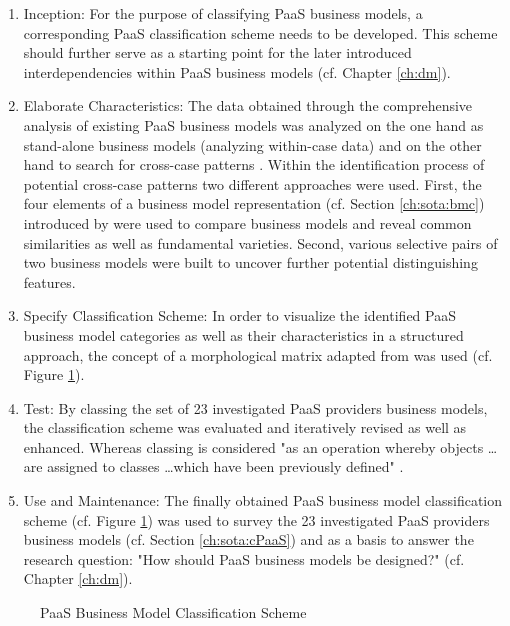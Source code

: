 \begin{enumerate}
	\item Inception: For the purpose of classifying \ac{PaaS} business models, a corresponding \ac{PaaS} classification scheme needs to be developed. This scheme should further serve as a starting point for the later introduced interdependencies within \ac{PaaS} business models (cf. Chapter \ref{ch:dm}).

	\item Elaborate Characteristics: The data obtained through the comprehensive analysis of existing \ac{PaaS} business models was analyzed on the one hand as stand-alone business models (analyzing within-case data) and on the other hand to search for cross-case patterns \citep[pp. 539-540]{Eisenhardt1989}. Within the identification process of potential cross-case patterns two different approaches were used. First, the four elements of a business model representation (cf. Section \ref{ch:sota:bmc}) introduced by \citet{Johnson2008} were used to compare business models and reveal common similarities as well as fundamental varieties. Second, various selective pairs of two business models were built to uncover further potential distinguishing features. 

	\item Specify Classification Scheme: In order to visualize the identified \ac{PaaS} business model categories as well as their characteristics in a structured approach, the concept of a morphological matrix adapted from \citet{ Zwicky1969} was used (cf. Figure \ref{fig:cs}).

	\item Test: By classing the set of 23 investigated \ac{PaaS} providers business models, the classification scheme was evaluated and iteratively revised as well as enhanced. Whereas classing is considered "as an operation whereby objects \ldots are assigned to classes \ldots which have been previously defined" \citep[p. 130]{Marradi1990}.

	\item Use and Maintenance: The finally obtained \ac{PaaS} business model classification scheme (cf. Figure \ref{fig:cs}) was used to survey the 23 investigated \ac{PaaS} providers business models (cf. Section \ref{ch:sota:cPaaS}) and as a basis to answer the research question: "How should \ac{PaaS} business models be designed?" (cf. Chapter \ref{ch:dm}).

\end{enumerate}

\begin{figure}[htb]
	\centering
	
	\caption{PaaS Business Model Classification Scheme}
	\label{fig:cs}
\end{figure}


